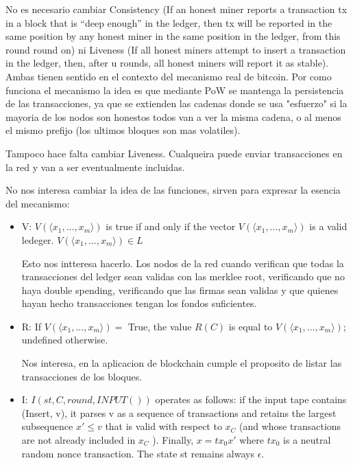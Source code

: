 \documentclass[12pt,addpoints,answers]{exam}
\begin{document}
\begin{questions}
\begin{parts}
\begin{solution}
        No es necesario cambiar Consistency (If an honest miner reports a transaction tx in a block that is “deep enough” 
        in the ledger, then tx will be reported in the same position by any honest miner in  
        the same position in the ledger, from this round round on) 
        ni Liveness (If all honest miners attempt to insert a transaction in the ledger, then, after u rounds, 
        all honest miners will report it as stable). Ambas tienen sentido en el contexto del mecanismo 
        real de bitcoin. Por como funciona el mecanismo la idea es que mediante PoW se mantenga la persistencia 
        de las transacciones, ya que se extienden las cadenas donde se usa "esfuerzo" si la mayoria
        de los nodos son honestos todos van a ver la misma cadena, o al menos el mismo prefijo 
        (los ultimos bloques son mas volatiles).

        Tampoco hace falta cambiar Liveness. Cualqueira puede enviar transacciones en la red y van a ser eventualmente incluidas.
        
        No nos interesa cambiar la idea de las funciones, sirven para expresar la esencia del mecanismo:

        \begin{itemize}
            \item{V: $V(\langle x_1, ... , x_m \rangle)$ is true if and only if the vector $V(\langle x_1, ... , x_m \rangle)$
            is a valid ledeger. $V(\langle x_1, ... , x_m \rangle) \in L$
            
            Esto nos intteresa hacerlo. Los nodos de la red cuando verifican que todas la transacciones del ledger
            sean validas con las merklee root, verificando que no haya double spending, verificando que las firmas sean validas
            y que quienes hayan hecho transacciones tengan los fondos suficientes.
            }
            
            \item{R: If $V(\langle x_1, ... , x_m \rangle) = $ True, the value $R(C)$ is equal to 
            $V(\langle x_1, ... , x_m \rangle)$; undefined otherwise.  
            
            Nos interesa, en la aplicacion de blockchain cumple el proposito de listar las transacciones de los bloques.
            }

            \item{I: $I(st,C,round,INPUT())$ operates as follows: if the input tape contains (Insert, v), 
            it parses v as a sequence of transactions and retains the largest subsequence $x' \leq v$ 
            that is valid with respect to $x_C$ (and whose transactions are not already included in $x_C$ ).
            Finally, $x = tx_0 x'$ where $tx_0$ is a neutral random nonce transaction. The state st remains always $\epsilon$.
            
}
\end{itemize}
\end{solution}
\end{parts}
\end{questions}
\end{document}
